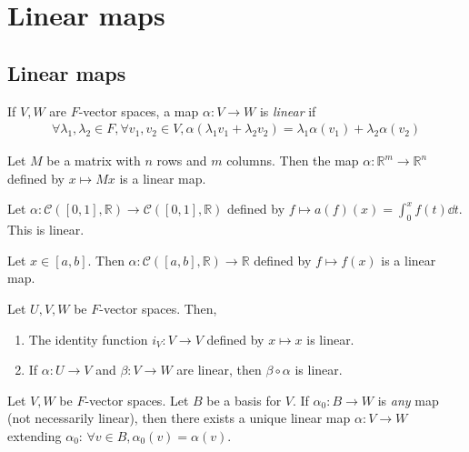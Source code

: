 \section{Linear maps}
\subsection{Linear maps}
\begin{definition}
    If $V, W$ are $F$-vector spaces, a map $\alpha \colon V \to W$ is \textit{linear} if
    \begin{align*}
        \forall \lambda_1, \lambda_2 \in F, \forall v_1, v_2 \in V, \alpha(\lambda_1 v_1 + \lambda_2 v_2) = \lambda_1 \alpha(v_1) + \lambda_2 \alpha(v_2)
    \end{align*}
\end{definition}
\begin{example}
    Let $M$ be a matrix with $n$ rows and $m$ columns.
    Then the map $\alpha \colon \mathbb R^m \to \mathbb R^n$ defined by $x \mapsto M x$ is a linear map.
\end{example}
\begin{example}
    Let $\alpha \colon \mathcal C([0,1], \mathbb R) \to \mathcal C([0,1], \mathbb R)$ defined by $f \mapsto a(f)(x) = \int_0^x f(t) \dd{t}$.
    This is linear.
\end{example}
\begin{example}
    Let $x \in [a,b]$.
    Then $\alpha \colon \mathcal C([a,b], \mathbb R) \to \mathbb R$ defined by $f \mapsto f(x)$ is a linear map.
\end{example}
\begin{remark}
    Let $U, V, W$ be $F$-vector spaces.
    Then,
    \begin{enumerate}
        \item The identity function $i_V \colon V \to V$ defined by $x \mapsto x$ is linear.
        \item If $\alpha \colon U \to V$ and $\beta \colon V \to W$ are linear, then $\beta \circ \alpha$ is linear.
    \end{enumerate}
\end{remark}

\begin{lemma}
    Let $V, W$ be $F$-vector spaces.
    Let $B$ be a basis for $V$.
    If $\alpha_0 \colon B \to W$ is \textit{any} map (not necessarily linear), then there exists a unique linear map $\alpha \colon V \to W$ extending $\alpha_0$: $\forall v \in B, \alpha_0(v) = \alpha(v)$.
\end{lemma}

